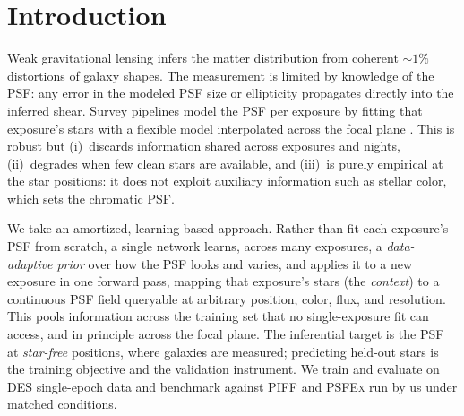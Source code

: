 \documentclass[twocolumn]{aastex701}
\begin{document}
\section{Introduction} \label{sec:intro}

Weak gravitational lensing infers the matter distribution from coherent ${\sim}1\%$
distortions of galaxy shapes. The measurement is limited by knowledge of the PSF: any
error in the modeled PSF size or ellipticity propagates directly into the inferred shear.
Survey pipelines model the PSF per exposure by fitting that exposure's stars with a
flexible model interpolated across the focal plane \citep[\textsc{PSFEx};][]{Bertin2011}
\citep[\textsc{PIFF};][]{Jarvis2021}. This is robust but (i)~discards information shared
across exposures and nights, (ii)~degrades when few clean stars are available, and
(iii)~is purely empirical at the star positions: it does not exploit auxiliary
information such as stellar color, which sets the chromatic PSF.

We take an amortized, learning-based approach. Rather than fit each exposure's PSF from
scratch, a single network learns, across many exposures, a \emph{data-adaptive prior}
over how the PSF looks and varies, and applies it to a new exposure in one forward pass,
mapping that exposure's stars (the \emph{context}) to a continuous PSF field queryable at
arbitrary position, color, flux, and resolution. This pools information across
the training set that no single-exposure fit can access, and in principle across the
focal plane. The inferential target is
the PSF at \emph{star-free} positions, where galaxies are measured; predicting held-out
stars is the training objective and the validation instrument. We train and evaluate on
DES single-epoch data and benchmark against \textsc{PIFF} and \textsc{PSFEx} run by us
under matched conditions.
\end{document}
